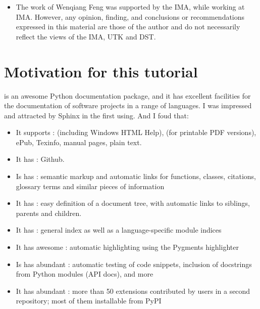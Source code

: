\documentclass[letterpaper,12pt,english]{sphinxmanual}
\begin{document}
\begin{itemize}
\item {} 

The work of Wenqiang Feng was supported by the IMA, while working at IMA. However, any opinion, finding, and conclusions or recommendations expressed in this material are those of the author and do not necessarily reflect the views of the IMA, UTK and DST.

\end{itemize}


\section{Motivation for this tutorial}
\label{\detokenize{preface:motivation-for-this-tutorial}}
 is an awesome Python documentation package, and it has excellent facilities for the documentation of software projects in a range of languages. I was impressed and attracted by Sphinx in the first using. And I foud that:
\begin{itemize}
\item {} 
It supports :  (including Windows HTML Help),  (for printable PDF versions), ePub, Texinfo, manual pages, plain text.

\item {} 
It has : Github.

\item {} 
Is has : semantic markup and automatic links for functions, classes, citations, glossary terms and similar pieces of information

\item {} 
It has : easy definition of a document tree, with automatic links to siblings, parents and children.

\item {} 
It has : general index as well as a language-specific module indices

\item {} 
It has awesome : automatic highlighting using the Pygments highlighter

\item {} 
Is has abundant : automatic testing of code snippets, inclusion of docstrings from Python modules (API docs), and more

\item {} 
It has abundant : more than 50 extensions contributed by users in a second repository; most of them installable from PyPI

\end{itemize}
\end{document}

